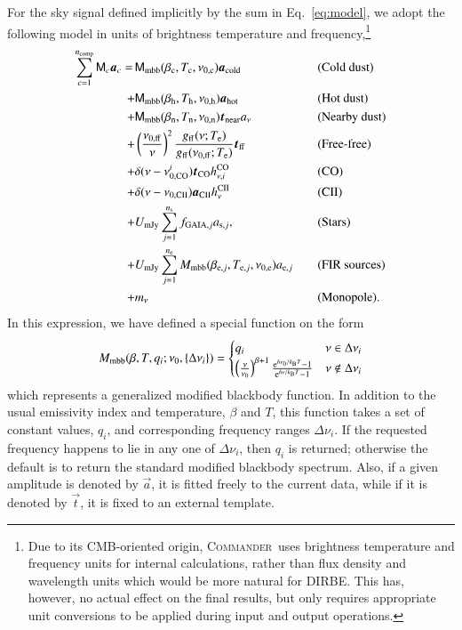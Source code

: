 \documentclass{aa}
\def\commander{\textsc{Commander}}
\renewcommand{\t}[0]{\vec{t}}
\renewcommand{\a}[0]{\vec{a}}
\newcommand{\M}[0]{\tens{M}}
\newcommand{\Te}[0]{T_{\rm e}}
\newcommand{\e}{\mathrm e}
\def\Tcold{\ifmmode T_\mathrm{c}\else $T_{\mathrm{c}}$\fi}
\def\Thot{\ifmmode T_\mathrm{h}\else $T_{\mathrm{h}}$\fi}
\def\Tnear{\ifmmode T_\mathrm{n}\else $T_{\mathrm{n}}$\fi}
\def\bcold{\ifmmode \beta_\mathrm{c}\else $\beta_{\mathrm{c}}$\fi}
\def\bhot{\ifmmode \beta_\mathrm{h}\else $\beta_{\mathrm{h}}$\fi}
\def\bnear{\ifmmode \beta_\mathrm{n}\else $\beta_{\mathrm{n}}$\fi}
\def\nuzeroff{\ifmmode \nu_{0,\mathrm{ff}}\else $\nu_{0,\mathrm{ff}}$\fi}
\def\nuzerocold{\ifmmode \nu_{0,\mathrm{c}}\else $\nu_{0,\mathrm{c}}$\fi}
\def\nuzerohot{\ifmmode \nu_{0,\mathrm{h}}\else $\nu_{0,\mathrm{h}}$\fi}
\def\nuzeronear{\ifmmode \nu_{0,\mathrm{n}}\else $\nu_{0,\mathrm{n}}$\fi}
\def\Te{\ifmmode T_{\mathrm{e}}\else $T_{\mathrm{e}}$\fi}
\def\kB{\ifmmode k_\mathrm{B}\else $k_{\mathrm{B}}$\fi}
\begin{document}
For the sky signal defined implicitly by the sum in
Eq.~\eqref{eq:model}, we adopt the following model in units of
brightness temperature and frequency,\footnote{Due to its CMB-oriented
origin, \commander\ uses brightness temperature and frequency units
for internal calculations, rather than flux density and wavelength
units which would be more natural for DIRBE. This has, however, no
actual effect on the final results, but only requires appropriate unit
conversions to be applied during input and output operations. }
\begin{alignat}{4}
  \sum_{c=1}^{n_{\mathrm{comp}}} \M_c \a_c  = \,
  &\M_{\mathrm{mbb}}(\bcold,\Tcold,\nuzerocold)\vec{a}_{\mathrm{cold}}
  && \textrm{(Cold dust)}\label{eq:skymodel}\\
  + &\M_{\mathrm{mbb}}(\bhot,\Thot,\nuzerohot)
  \vec{a}_{\mathrm{hot}} && \textrm{(Hot dust)}\nonumber \\
  + &\M_{\mathrm{mbb}}(\bnear,\Tnear,\nuzeronear) \t_{\mathrm{near}}
  a_{\nu} && \textrm{(Nearby dust)} \nonumber \\
  + &\left(\frac{\nuzeroff}{\nu}\right)^2
  \frac{g_{\mathrm{ff}}(\nu;\Te) }{g_{\mathrm{ff}}(\nuzeroff;\Te)}
  \vec{t}_{\mathrm{ff}} && \textrm{(Free-free)} \nonumber\\
  + &\delta(\nu-\nu_{0,\mathrm{CO}}^i) \t_{\mathrm{CO}}
  h^{\mathrm{CO}}_{\nu,i} && \textrm{(CO)}\nonumber\\
  + &\delta(\nu-\nu_{0,\mathrm{CII}}) \a_{\mathrm{CII}}
  h^{\mathrm{CII}}_{\nu} && \textrm{(CII)}\nonumber \\
  + &U_{\mathrm{mJy}} \sum_{j=1}^{n_{\mathrm{s}}}
  f_{\mathrm{GAIA},j} a_{\mathrm{s},j}, &\quad&
  \textrm{(Stars)} \nonumber\\
    + &U_{\mathrm{mJy}} \sum_{j=1}^{n_{\mathrm{e}}}
  M_{\mathrm{mbb}}(\beta_{\mathrm{e},j},
  T_{\mathrm{e},j}, \nu_{0,\mathrm{e}})
  a_{\mathrm{e},j} && \textrm{(FIR sources)}\nonumber\\
  + &m_{\nu} && \textrm{(Monopole)}. \nonumber
\end{alignat}
In this expression, we have defined a special function on the form
\begin{equation}
  M_{\mathrm{mbb}}(\beta, T, q_i;\nu_0, \{\Delta\nu_i\}) =
    \begin{cases}
      q_i & \nu \in \Delta\nu_i\\
      \left(\frac{\nu}{\nu_0}\right)^{\beta+1}
  \frac{\e^{h\nu_0/\kB T}-1}{\e^{h\nu/\kB T}-1} & \nu \notin \Delta\nu_i
    \end{cases}       
\end{equation}
which represents a generalized modified blackbody function. In
addition to the usual emissivity index and temperature, $\beta$ and
$T$, this function takes a set of constant values, $q_i$, and
corresponding frequency ranges $\Delta\nu_i$. If the requested
frequency happens to lie in any one of $\Delta\nu_i$, then $q_i$ is
returned; otherwise the default is to return the standard modified
blackbody spectrum. Also, if a given amplitude is denoted by $\a$, it
is fitted freely to the current data, while if it is denoted by $\t$,
it is fixed to an external template.
\end{document}
